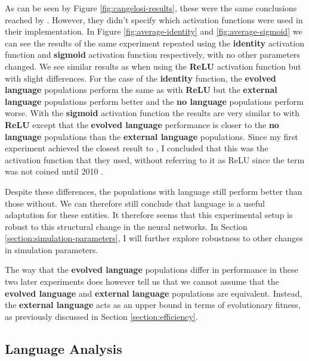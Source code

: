 \documentclass[12pt,a4paper,twoside,openright]{report}
\begin{document}
As can be seen by Figure \ref{fig:cangelosi-results}, these were the same conclusions reached by \citet{Cangelosi1998}. However, they didn't specify which activation functions were used in their implementation. In Figure \ref{fig:average-identity} and \ref{fig:average-sigmoid} we can see the results of the same experiment repeated using the {\bf identity} activation function and {\bf sigmoid} activation function respectively, with no other parameters changed. We see similar results as when using the {\bf ReLU} activation function but with slight differences. For the case of the {\bf identity} function, the {\bf evolved language} populations perform the same as with {\bf ReLU} but the {\bf external language} populations perform better and the {\bf no language} populations perform worse. With the {\bf sigmoid} activation function the results are very similar to with {\bf ReLU} except that the {\bf evolved language} performance is closer to the {\bf no language} populations than the {\bf external language} populations. Since my first experiment achieved the closest result to \citet{Cangelosi1998}, I concluded that this was the activation function that they used, without referring to it as ReLU since the term was not coined until 2010 \citep{nair2010rectified}.

Despite these differences, the populations with language still perform better than those without. We can therefore still conclude that language is a useful adaptation for these entities. It therefore seems that this experimental setup is robust to this structural change in the neural networks. In Section \ref{section:simulation-parameters}, I will further explore robustness to other changes in simulation parameters. 

The way that the {\bf evolved language} populations differ in performance in these two later experiments does however tell us that we cannot assume that the {\bf evolved language} and {\bf external language} populations are equivalent. Instead, the {\bf external language} acts as an upper bound in terms of evolutionary fitness, as previously discussed in Section \ref{section:efficiency}. %


\subsection{Language Analysis}\label{section:languageanalysis}
\end{document}
